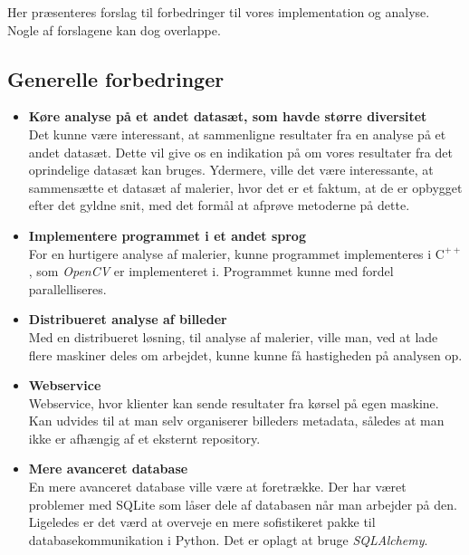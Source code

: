{
{\sffamily Her præsenteres forslag til forbedringer til vores
implementation og analyse. Nogle af forslagene kan dog overlappe.
}

\subsection{Generelle forbedringer}
\begin{itemize}
    \item \textbf{Køre analyse på et andet datasæt, som havde større diversitet}\\
        Det kunne være interessant, at sammenligne resultater fra en
        analyse på et andet datasæt. Dette vil give os en indikation på
        om vores resultater fra det oprindelige datasæt kan bruges.
        Ydermere, ville det være interessante, at sammensætte et datasæt
        af malerier, hvor det er et faktum, at de er opbygget efter det
        gyldne snit, med det formål at afprøve metoderne på dette.
    \item \textbf{Implementere programmet i et andet sprog}\\
        For en hurtigere analyse af malerier, kunne programmet
        implementeres i $\textrm{C}^{++}$, som \emph{OpenCV} er
        implementeret i. Programmet kunne med fordel parallelliseres.
    \item \textbf{Distribueret analyse af billeder}\\
        Med en distribueret løsning, til analyse af malerier, ville man,
        ved at lade flere maskiner deles om arbejdet, kunne kunne få
        hastigheden på analysen op.
    \item \textbf{Webservice}\\
        Webservice, hvor klienter kan sende resultater fra kørsel på
        egen maskine. Kan udvides til at man selv organiserer billeders
        metadata, således at man ikke er afhængig af et eksternt
        repository.
    \item \textbf{Mere avanceret database}\\
        En mere avanceret database ville være at foretrække. Der har
        været problemer med SQLite som låser dele af databasen når man
        arbejder på den. Ligeledes er det værd at overveje en mere
        sofistikeret pakke til databasekommunikation i Python. Det er
        oplagt at bruge \emph{SQLAlchemy}\cite{SQLAlchemy}.
\end{itemize}

}
